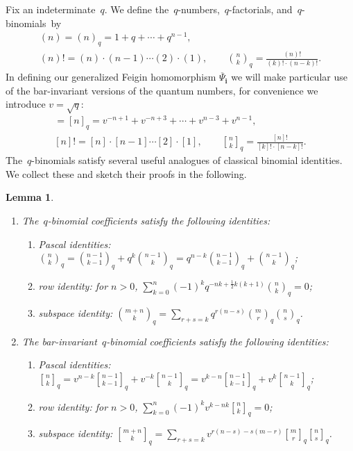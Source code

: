 \documentclass[pdftex]{sigma}
\numberwithin{equation}{section}
\newtheorem{Lemma}[Theorem]{Lemma}
\begin{document}
Fix an indeterminate~$q$.
We def\/ine the~$q$-numbers,~$q$-factorials, and~$q$-binomials~by
\begin{gather*}
(n)=(n)_q=1+q+\cdots+q^{n-1},
\\
(n)!=(n)\cdot(n-1)\cdots(2)\cdot(1),
\qquad
{n\choose k}_q=\frac{(n)!}{(k)!\cdot(n-k)!}.
\end{gather*}
In def\/ining our generalized Feigin homomorphism $\overline\Psi_\mathbf{i}$ we will make particular use of the
bar-invariant versions of the quantum numbers, for convenience we introduce $v=\sqrt{q}$:
\begin{gather*}
[n]=[n]_q=v^{-n+1}+v^{-n+3}+\cdots+v^{n-3}+v^{n-1},
\\
[n]!=[n]\cdot[n-1]\cdots[2]\cdot[1],
\qquad
{n\brack k}_q=\frac{[n]!}{[k]!\cdot[n-k]!}.
\end{gather*}
The~$q$-binomials satisfy several useful analogues of classical binomial identities.
We collect these and sketch their proofs in the following.
\begin{Lemma}\label{lem:binomial_identities}\qquad
\begin{enumerate}\itemsep=0pt
\item[$1.$] The~$q$-binomial coefficients satisfy the following identities:
\begin{enumerate}[\upshape (a)]\itemsep=0pt
\item Pascal identities: ${n\choose k}_q={n-1\choose k-1}_q+q^k{n-1\choose k}_q=q^{n-k}{n-1\choose k-1}_q+{n-1\choose k}_q$;
\item row identity: for $n>0$, $\sum\limits_{k=0}^n (-1)^k q^{-nk+\frac{1}{2} k(k+1)}{n\choose k}_q=0$;
\item subspace identity: ${m+n\choose k}_q=\sum\limits_{r+s=k}q^{r(n-s)}{m\choose r}_q{n\choose s}_q$.
\end{enumerate}
\item[$2.$] The bar-invariant~$q$-binomial coefficients satisfy the following identities:
\begin{enumerate}[\upshape (a)]\itemsep=0pt
\item Pascal identities: ${n\brack k}_q=v^{n-k}{n-1\brack k-1}_q+v^{-k}{n-1\brack k}_q=v^{k-n}{n-1\brack k-1}_q+v^k{n-1\brack k}_q$;
\item row identity: for $n>0$, $\sum\limits_{k=0}^n (-1)^k v^{k-nk} {n\brack k}_q=0$;
\item subspace identity: ${m+n\brack k}_q=\sum\limits_{r+s=k}v^{r(n-s)-s(m-r)}{m\brack r}_q{n\brack s}_q$.
\end{enumerate}
\end{enumerate}
\end{Lemma}
\end{document}
